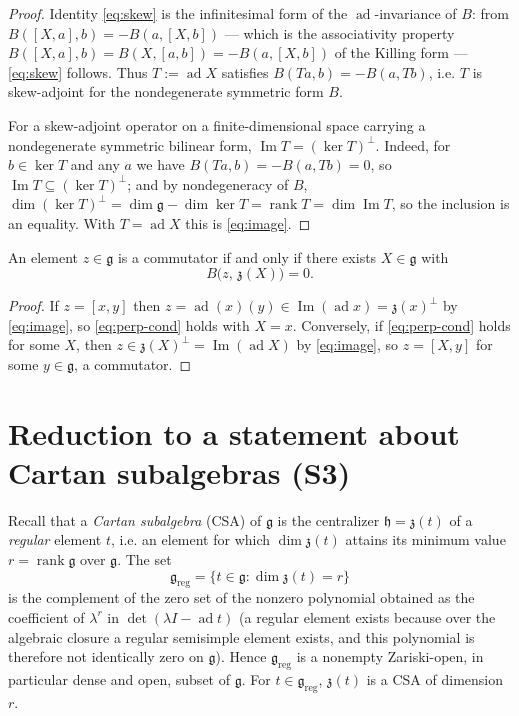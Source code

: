 \documentclass{amsart}
\theoremstyle{definition}
\begin{document}
\begin{proof}
Identity \eqref{eq:skew} is the infinitesimal form of the
$\operatorname{ad}$-invariance of $B$: from $B([X,a],b)=-B(a,[X,b])$ — which is the
associativity property $B([X,a],b)=B(X,[a,b])=-B(a,[X,b])$ of the Killing form —
\eqref{eq:skew} follows. Thus $T:=\operatorname{ad}X$ satisfies
$B(Ta,b)=-B(a,Tb)$, i.e. $T$ is skew-adjoint for the nondegenerate symmetric form
$B$.

For a skew-adjoint operator on a finite-dimensional space carrying a nondegenerate
symmetric bilinear form, $\operatorname{Im}T=(\ker T)^{\perp}$. Indeed, for
$b\in\ker T$ and any $a$ we have $B(Ta,b)=-B(a,Tb)=0$, so
$\operatorname{Im}T\subseteq(\ker T)^{\perp}$; and by nondegeneracy of $B$,
$\dim(\ker T)^{\perp}=\dim\mathfrak g-\dim\ker T=\operatorname{rank}T=
\dim\operatorname{Im}T$, so the inclusion is an equality. With $T=\operatorname{ad}X$
this is \eqref{eq:image}.
\end{proof}

\begin{corollary}\label{cor:reduce}
An element $z\in\mathfrak g$ is a commutator if and only if there exists
$X\in\mathfrak g$ with
\begin{equation}\label{eq:perp-cond}
  B\bigl(z,\,\mathfrak z(X)\bigr)=0 .
\end{equation}
\end{corollary}

\begin{proof}
If $z=[x,y]$ then $z=\operatorname{ad}(x)(y)\in\operatorname{Im}(\operatorname{ad}x)
=\mathfrak z(x)^{\perp}$ by \eqref{eq:image}, so \eqref{eq:perp-cond} holds with
$X=x$. Conversely, if \eqref{eq:perp-cond} holds for some $X$, then
$z\in\mathfrak z(X)^{\perp}=\operatorname{Im}(\operatorname{ad}X)$ by
\eqref{eq:image}, so $z=[X,y]$ for some $y\in\mathfrak g$, a commutator.
\end{proof}

\section{Reduction to a statement about Cartan subalgebras (S3)}

Recall that a \emph{Cartan subalgebra} (CSA) of $\mathfrak g$ is the centralizer
$\mathfrak h=\mathfrak z(t)$ of a \emph{regular} element $t$, i.e. an element for
which $\dim\mathfrak z(t)$ attains its minimum value $r=\operatorname{rank}
\mathfrak g$ over $\mathfrak g$. The set
\[
  \mathfrak g_{\mathrm{reg}}=\{t\in\mathfrak g:\dim\mathfrak z(t)=r\}
\]
is the complement of the zero set of the nonzero polynomial obtained as the
coefficient of $\lambda^{r}$ in $\det(\lambda I-\operatorname{ad}t)$ (a regular
element exists because over the algebraic closure a regular semisimple element
exists, and this polynomial is therefore not identically zero on
$\mathfrak g$). Hence $\mathfrak g_{\mathrm{reg}}$ is a nonempty Zariski-open,
in particular dense and open, subset of $\mathfrak g$. For $t\in
\mathfrak g_{\mathrm{reg}}$, $\mathfrak z(t)$ is a CSA of dimension $r$.
\end{document}
